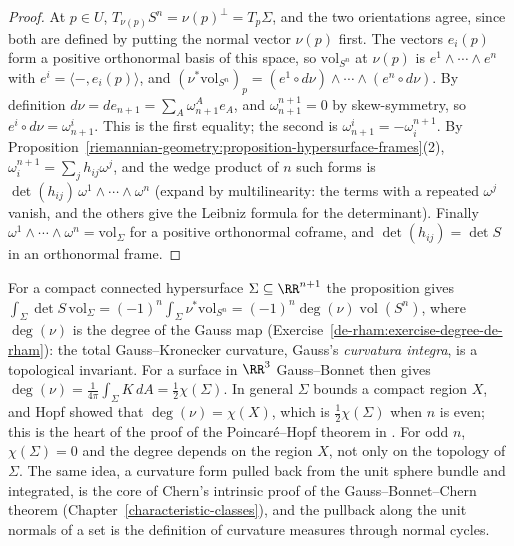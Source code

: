 \begin{proof}
At $p \in U$, $T_{\nu(p)}S^n = \nu(p)^\perp = T_p\Sigma$, and the two orientations agree, since both are defined by putting the normal vector $\nu(p)$ first. The vectors $e_i(p)$ form a positive orthonormal basis of this
space, so $\mathrm{vol}_{S^n}$ at $\nu(p)$ is $e^1 \wedge \cdots \wedge e^n$ with $e^i = \langle -, e_i(p)\rangle$, and
$(\nu^*\mathrm{vol}_{S^n})_p = (e^1 \circ d\nu) \wedge \cdots \wedge (e^n \circ d\nu)$. By definition $d\nu = de_{n+1} = \sum_A\omega^A_{n+1}e_A$, and $\omega^{n+1}_{n+1} = 0$ by skew-symmetry, so
$e^i \circ d\nu = \omega^i_{n+1}$. This is the first equality; the second is $\omega^i_{n+1} = -\omega^{n+1}_i$. By Proposition~\ref{riemannian-geometry:proposition-hypersurface-frames}(2),
$\omega^{n+1}_i = \sum_jh_{ij}\omega^j$, and the wedge product of $n$ such forms is $\det(h_{ij})\,\omega^1 \wedge \cdots \wedge \omega^n$ (expand by multilinearity: the terms with a repeated $\omega^j$ vanish, and the others give the Leibniz formula for the determinant). Finally
$\omega^1 \wedge \cdots \wedge \omega^n = \mathrm{vol}_\Sigma$ for a positive orthonormal coframe, and $\det(h_{ij}) = \det S$ in an orthonormal frame.
\end{proof}

\begin{remark}\label{riemannian-geometry:remark-curvatura-integra}
For a compact connected hypersurface $\Sigma \subseteq \RR^{n+1}$ the proposition gives $\int_\Sigma\det S\,\mathrm{vol}_\Sigma = (-1)^n\int_\Sigma\nu^*\mathrm{vol}_{S^n} = (-1)^n\deg(\nu)\operatorname{vol}(S^n)$, where $\deg(\nu)$ is the degree of
the Gauss map (Exercise~\ref{de-rham:exercise-degree-de-rham}): the total Gauss--Kronecker curvature, Gauss's \emph{curvatura integra}, is a topological invariant. For a surface in $\RR^3$ Gauss--Bonnet then gives
$\deg(\nu) = \frac{1}{4\pi}\int_\Sigma K\,dA = \frac12\chi(\Sigma)$. In general $\Sigma$ bounds a compact region $X$, and Hopf showed that $\deg(\nu) = \chi(X)$, which is $\frac12\chi(\Sigma)$ when $n$ is even;
this is the heart of the proof of the Poincar\'e--Hopf theorem in \cite{milnor-differential-viewpoint}. For odd $n$, $\chi(\Sigma) = 0$ and the degree depends on the region $X$, not only on the topology of $\Sigma$. The same idea, a curvature form pulled back from the unit sphere bundle and integrated, is the core of Chern's intrinsic
proof of the Gauss--Bonnet--Chern theorem (Chapter~\ref{characteristic-classes}), and the pullback along the unit normals of a set is the definition of curvature measures through normal cycles.
\end{remark}

